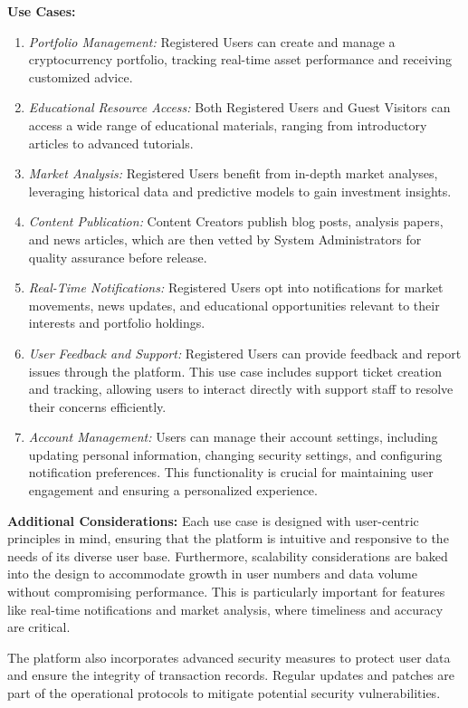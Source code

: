 \documentclass[12pt]{report}
\begin{document}
\textbf{Use Cases:}
\begin{enumerate}
    \item \textit{Portfolio Management:} Registered Users can create and manage a cryptocurrency portfolio, tracking real-time asset performance and receiving customized advice.
    \item \textit{Educational Resource Access:} Both Registered Users and Guest Visitors can access a wide range of educational materials, ranging from introductory articles to advanced tutorials.
    \item \textit{Market Analysis:} Registered Users benefit from in-depth market analyses, leveraging historical data and predictive models to gain investment insights.
    \item \textit{Content Publication:} Content Creators publish blog posts, analysis papers, and news articles, which are then vetted by System Administrators for quality assurance before release.
    \item \textit{Real-Time Notifications:} Registered Users opt into notifications for market movements, news updates, and educational opportunities relevant to their interests and portfolio holdings.
    \item \textit{User Feedback and Support:} Registered Users can provide feedback and report issues through the platform. This use case includes support ticket creation and tracking, allowing users to interact directly with support staff to resolve their concerns efficiently.
    \item \textit{Account Management:} Users can manage their account settings, including updating personal information, changing security settings, and configuring notification preferences. This functionality is crucial for maintaining user engagement and ensuring a personalized experience.
\end{enumerate}

\textbf{Additional Considerations:}
Each use case is designed with user-centric principles in mind, ensuring that the platform is intuitive and responsive to the needs of its diverse user base. Furthermore, scalability considerations are baked into the design to accommodate growth in user numbers and data volume without compromising performance. This is particularly important for features like real-time notifications and market analysis, where timeliness and accuracy are critical.

The platform also incorporates advanced security measures to protect user data and ensure the integrity of transaction records. Regular updates and patches are part of the operational protocols to mitigate potential security vulnerabilities.
\end{document}
